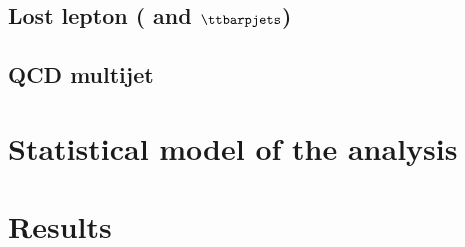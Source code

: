 



\subsection{Lost lepton (\texorpdfstring{\PW}{W} and \texorpdfstring{$\ttbarpjets$}{ttbar plus jets})}
\label{subsec:htoinv_lost_lepton_bkg}




\subsection{\texorpdfstring{\ztonunupjets}{Z to nunu + jets}}
\label{subsec:htoinv_znunu_bkg}




\subsection{QCD multijet}
\label{subsec:htoinv_qcd_multijet_bkg}





\section{Statistical model of the analysis}
\label{sec:htoinv_satistical_treatment}




\section{Results}
\label{sec:htoinv_results}
